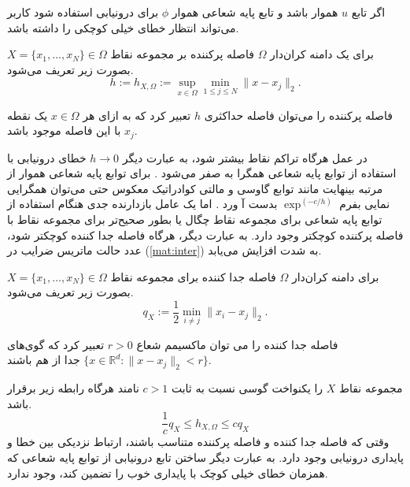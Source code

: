 اگر تابع 
$u$
هموار باشد و تابع پایه شعاعی هموار
$\phi$
برای درونیابی استفاده شود کاربر می‌تواند انتظار خطای خیلی کوچکی را داشته باشد.
\begin{definition}
	\citep{Wendland}
	برای یک دامنه کران‌دار 
	$\Omega$
	فاصله پرکننده
	بر مجموعه نقاط
	$X=\{x_1,\ldots,x_N\}\in\Omega$
	بصورت زیر تعریف می‌شود.
	\begin{equation*}
		h:=h_{X,\Omega}:=\sup_{x\in\Omega}\min_{1\leq j\leq N}\|x-x_j\|_2.
	\end{equation*}
\end{definition}
فاصله پرکننده را می‌توان فاصله حداکثری
$h$
تعبیر کرد که به ازای هر
$x\in\Omega$
یک نقطه 
$x_j$
با این فاصله موجود باشد.

در عمل هرگاه تراکم نقاط بیشتر شود، به عبارت دیگر
$h\rightarrow 0$
خطای درونیابی با استفاده از توابع پایه شعاعی همگرا به صفر می‌شود
\citep{Wu}.
برای توابع پایه شعاعی هموار از مرتبه بینهایت مانند توابع گاوسی و مالتی کوادراتیک معکوس حتی می‌توان همگرایی نمایی بفرم
$\exp^{(-c/h)}$
بدست آ ورد
\citep{Wendland}.
اما یک عامل بازدارنده جدی هنگام استفاده از توابع پایه شعاعی برای مجموعه نقاط چگال  یا بطور صحیح‌تر برای مجموعه نقاط با فاصله پرکننده کوچکتر وجود دارد. به عبارت دیگر، هرگاه فاصله جدا کننده 
کوچکتر شود، عدد حالت ماتریس ضرایب در 
(\ref{mat:inter})
به شدت افزایش می‌یابد.
\begin{definition}
	\citep{Larsson}
	برای دامنه کران‌دار
	$\Omega$
	فاصله جدا کننده برای مجموعه نقاط 
	$X=\{x_1,\ldots,x_N\}\in\Omega$
	بصورت زیر تعریف می‌شود.
	\begin{equation*}
		q_X:=\frac{1}{2}\min_{i\neq j}\|x_i-x_j\|_2.
	\end{equation*}
\end{definition}
فاصله جدا کننده را می توان ماکسیمم شعاع 
$r>0$
تعبیر کرد که گوی‌های 
$\{x \in \mathbb{R}^d: \|x - x _j\|_2 <r\}$
جدا از هم باشند.

مجموعه نقاط 
$X$
را یکنواخت گوسی
نسبت به ثابت
$c > 1$
نامند هرگاه رابطه زیر برقرار باشد.
\begin{equation*}
	\frac{1}{c}q_X\leq h_{X,\Omega}\leq cq_X
\end{equation*}
وقتی که فاصله جدا کننده و  فاصله پرکننده متناسب باشند، ارتباط نزدیکی بین خطا و پایداری درونیابی وجود دارد. به عبارت دیگر ساختن تابع درونیابی از توابع پایه شعاعی که همزمان خطای خیلی کوچک با پایداری خوب را تضمین کند، وجود ندارد.



%